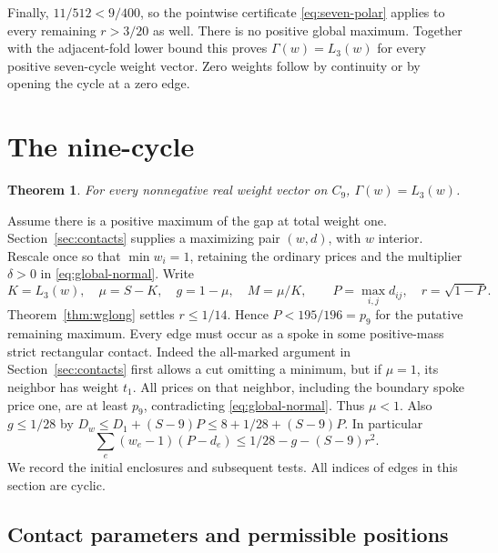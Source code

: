 \documentclass[11pt,a4paper]{article}
\newtheorem{theorem}{Theorem}[section]
\theoremstyle{definition}
\begin{document}
Finally, $11/512<9/400$, so the pointwise certificate
\eqref{eq:seven-polar} applies to every remaining
$r>3/20$ as well. There is no positive global maximum. Together with
the adjacent-fold lower bound this proves $\Gamma(w)=L_3(w)$ for every
positive seven-cycle weight vector. Zero weights follow by continuity
or by opening the cycle at a zero edge.

\section{The nine-cycle}\label{sec:nine}

\begin{theorem}\label{thm:wgnine}
For every nonnegative real weight vector on $C_9$, $\Gamma(w)=L_3(w)$.
\end{theorem}

Assume there is a positive maximum of the gap at total weight one.
Section~\ref{sec:contacts} supplies a maximizing pair $(w,d)$,
with $w$ interior. Rescale once so that $\min w_i=1$, retaining
the ordinary prices and the multiplier $\delta>0$ in
\eqref{eq:global-normal}. Write
\[
 K=L_3(w),\quad \mu=S-K,\quad g=1-\mu,\quad M=\mu/K,
 \qquad P=\max_{i,j}d_{ij},\quad r=\sqrt{1-P}.
\]
Theorem~\ref{thm:wglong} settles $r\le1/14$. Hence $P<195/196=p_9$
for the putative remaining maximum. Every edge must occur as a spoke
in some positive-mass strict rectangular contact. Indeed the
all-marked argument in Section~\ref{sec:contacts} first allows a cut
omitting a minimum, but if $\mu=1$, its neighbor has weight $t_1$.
All prices on that neighbor, including the boundary spoke price one,
are at least $p_9$, contradicting \eqref{eq:global-normal}.
Thus $\mu<1$. Also $g\le1/28$ by
$D_w\le D_1+(S-9)P\le 8+1/28+(S-9)P$. In particular
\begin{equation}
 \sum_e(w_e-1)(P-d_e)\le1/28-g-(S-9)r^2.
 \label{eq:wg9excess}
\end{equation}
We record the initial enclosures and subsequent tests. All indices of
edges in this section are cyclic.

\subsection{Contact parameters and permissible positions}
\end{document}
